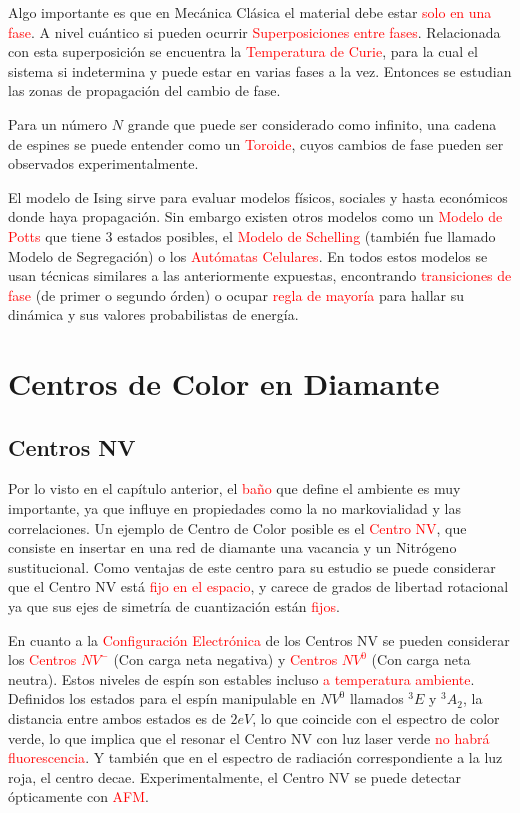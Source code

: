 \documentclass{book}
\begin{document}
Algo importante es que en Mecánica Clásica el material debe estar \textcolor{red}{solo en una fase}. A nivel cuántico si pueden ocurrir \textcolor{red}{Superposiciones entre fases}. Relacionada con esta superposición se encuentra la \textcolor{red}{Temperatura de Curie}, para la cual el sistema si indetermina y puede estar en varias fases a la vez. Entonces se estudian las zonas de propagación del cambio de fase.

Para un número $N$ grande que puede ser considerado como infinito, una cadena de espines se puede entender como un \textcolor{red}{Toroide}, cuyos cambios de fase pueden ser observados experimentalmente.

El modelo de Ising sirve para evaluar modelos físicos, sociales y hasta económicos donde haya propagación. Sin embargo existen otros modelos como un \textcolor{red}{Modelo de Potts} que tiene 3 estados posibles, el \textcolor{red}{Modelo de Schelling} (también fue llamado Modelo de Segregación) o los \textcolor{red}{Autómatas Celulares}. En todos estos modelos se usan técnicas similares a las anteriormente expuestas, encontrando \textcolor{red}{transiciones de fase} (de primer o segundo órden) o ocupar \textcolor{red}{regla de mayoría} para hallar su dinámica y sus valores probabilistas de energía.






\chapter{Centros de Color en Diamante}
\section{Centros NV}

Por lo visto en el capítulo anterior, el \textcolor{red}{baño} que define el ambiente es muy importante, ya que influye en propiedades como la no markovialidad y las correlaciones. Un ejemplo de Centro de Color posible es el \textcolor{red}{Centro NV}, que consiste en insertar en una red de diamante una vacancia y un Nitrógeno sustitucional. Como ventajas de este centro para su estudio se puede considerar que el Centro NV está \textcolor{red}{fijo en el espacio}, y carece de grados de libertad rotacional ya que sus ejes de simetría de cuantización están \textcolor{red}{fijos}.

En cuanto a la \textcolor{red}{Configuración Electrónica} de los Centros NV se pueden considerar los \textcolor{red}{Centros $NV^-$} (Con carga neta negativa) y \textcolor{red}{Centros $NV^0$} (Con carga neta neutra). Estos niveles de espín son estables incluso \textcolor{red}{a temperatura ambiente}. Definidos los estados para el espín manipulable en $NV^0$ llamados ${}^3E$ y ${}^3A_2$, la distancia entre ambos estados es de $2eV$, lo que coincide con el espectro de color verde, lo que implica que el resonar el Centro NV con luz laser verde \textcolor{red}{no habrá fluorescencia}. Y también que en el espectro de radiación correspondiente a la luz roja, el centro decae. Experimentalmente, el Centro NV se puede detectar ópticamente con \textcolor{red}{AFM}.
\end{document}
